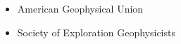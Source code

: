 

\begin{cvparagraph}

    \fontsize{11pt}{1.3em}\selectfont
    \begin{itemize}[leftmargin=2.5ex]
        \item {American Geophysical Union}
        \item {Society of Exploration Geophysicists }
    \end{itemize}


\end{cvparagraph}
